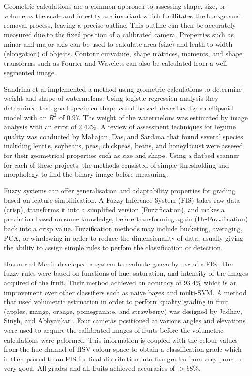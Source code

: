 \documentclass[fleqn,twoside,12pt]{report}
\begin{document}
Geometric calculations are a common approach to assessing shape, size, or volume as the scale and intestity are invariant which facillitates the background removal process, leaving a precise outline. This outline can then be accurately measured due to the fixed position of a calibrated camera. Properties such as minor and major axis can be used to calculate area (size) and lenth-to-width (elongation) of objects. Contour curvature, shape matrices, moments, and shape transforms such as Fourier and Wavelets can also be calculated from a well segmented image. 

Sandrina et al \cite{sandrina} implemented a method using geometric calculations to determine weight and shape of watermelons. Using logistic regression analysis they determined that good specimen shape could be well-described by an ellipsoid model with an $R^2$ of $0.97$. The weight of the watermelons was estimated by image analysis with an error of $2.42\%$. A review of assessment techniques for legume quality was conducted by Mahajan, Das, and Sardana \cite{mahajan} that found several species including lentils, soybeans, peas, chickpeas, beans, and honeylocust were assesed for their geometrical properties such as size and shape. Using a flatbed scanner for each of these projects, the methods consisted of simple thresholding and morphology to find the binary image before measuring. 


Fuzzy systems can offer generalisation and adaptability properties for grading based on feature simplification. A Fuzzy Inference System (FIS) takes raw data (crisp), transforms it into a simplified version (Fuzzification), and makes a prediction based on some knowledge, before transforming again (De-Fuzzification) back into a crisp value. Fuzzification methods may include bucketing, averaging, PCA, or windowing in order to reduce the dimensionality of data, usually giving the ability to assign simple rules to perfom the classification or detection.

Hasan and Monir \cite{hasan} developed a system to evaluate guava by use of a FIS. The fuzzy rules were based on functions of hue, saturation, and intensity of the images acquired of the fruit. Their method achieved an accuracy of $93.4\%$ which is an improvement over other classifiers such as naive bayes and multi-SVM. A method that used volumetric estimation in order to perform quality grading in fruit (apples, mango, orange, pomegranate, and strawberry) was designed by Jadhav, Singh, and Abhyankar \cite{jadhav}. Four cameras positioned at various angles and elevations were used to acquire the callibrated images of fruits before the volumetric calculations were peformed. This information is coupled with the colour values from the hue channel of HSV colour space to obtain a classification grade which is then passed to an FIS for final distribution into five grades from very poor to very good. All grades and all fruits achieved accuracies of $>98\%$. 
\end{document}
